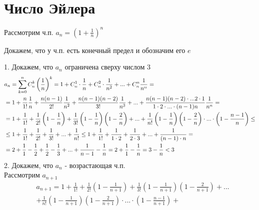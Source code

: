 \section{Число Эйлера}

{
Рассмотрим ч.п. $ a_n = (1 + \frac{1}{n})^n $

Докажем, что у ч.п. есть конечный предел и обозначим его $ e $

\begin{mcproof}
    1. Докажем, что $ a_n $ ограничена сверху числом 3
\begin{equation*}
\begin{split}
    & a_n = \sum_{k = 0}^{n} \Cmb{n}{k} \left(\frac{1}{n}\right)^k = 
        1 + \Cmb{n}{1} \cdot \frac{1}{n} + \Cmb{n}{2} \cdot \frac{1}{n^2} + ... + \Cmb{n}{n} \frac{1}{n^n} = \\
    & = 1
        + \frac{n}{1!} \frac{1}{n}
        + \frac{n(n-1)}{2!} \frac{1}{n^2}
        + \frac{n(n-1)(n-2)}{3!} \frac{1}{n^3}
        + ...
        + \frac{n (n - 1) (n - 2) \cdot ... 2 \cdot 1}{1 \cdot 2 \cdot ... \cdot (n - 1) n} \frac{1}{n^n} = \\
    & = 1 + \frac{1}{1!}
        + \frac{1}{2!} \left(1 - \frac{1}{n}\right)
        + \frac{1}{3!} \left(1 - \frac{1}{n}\right) \left(1 - \frac{2}{n}\right)
        + ...
        + \frac{1}{n!} \left(1 - \frac{1}{n}\right) \left(1 - \frac{2}{n}\right) \cdot ... \cdot \left(1 - \frac{n - 1}{n}\right) \le \\
    & \le 1 + \frac{1}{1!} + \frac{1}{2!} + \frac{1}{3!} + ... + \frac{1}{n!}
        \le 1 + \frac{1}{1!} + \frac{1}{1 \cdot 2} + \frac{1}{2 \cdot 3} + ... + \frac{1}{(n - 1) \cdot n} = \\
    & = 2 + \frac{1}{1} - \frac{1}{2} + \frac{1}{2} - \frac{1}{3} + ... + \frac{1}{n - 1} - \frac{1}{n}
        = 2 + \frac{1}{1} - \frac{1}{n} = 3 - \frac{1}{n} < 3 \\
\end{split}
\end{equation*}
    2. Докажем, что $ a_n $ - возрастающая ч.п. \\
    Рассмотрим $ a_{n + 1} $
\begin{equation*}
\begin{split}
    & a_{n + 1} =
        1 + \frac{1}{1!}
        + \frac{1}{2!} \left(1 - \frac{1}{n + 1}\right)
        + \frac{1}{3!} \left(1 - \frac{1}{n + 1}\right) \left(1 - \frac{2}{n + 1}\right)
        + ... \\
    & + \frac{1}{n!} \left(1 - \frac{1}{n + 1}\right) \left(1 - \frac{2}{n + 1}\right) \cdot ... \cdot \left(1 - \frac{n - 1}{n + 1}\right) + \\

\end{split}
\end{equation*}
\end{mcproof}}
